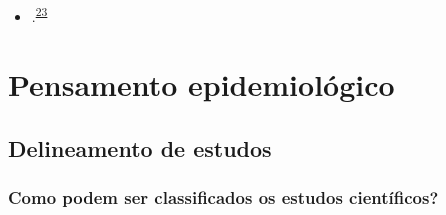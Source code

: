 \documentclass[
  a4paper,
]{book}
\providecommand{\tightlist}{%
  \setlength{\itemsep}{0pt}\setlength{\parskip}{0pt}}
\begin{document}
\begin{itemize}
\tightlist
\item
  .\textsuperscript{\protect\hyperlink{ref-feld1991}{23}}
\end{itemize}

\hypertarget{delineamento-estudos}{%
\chapter{\texorpdfstring{\textbf{Pensamento epidemiológico}}{Pensamento epidemiológico}}\label{delineamento-estudos}}

\hypertarget{delineamento-estudos}{%
\section{Delineamento de estudos}\label{delineamento-estudos}}

\hypertarget{como-podem-ser-classificados-os-estudos-cientuxedficos}{%
\subsection{Como podem ser classificados os estudos científicos?}\label{como-podem-ser-classificados-os-estudos-cientuxedficos}}
\end{document}
